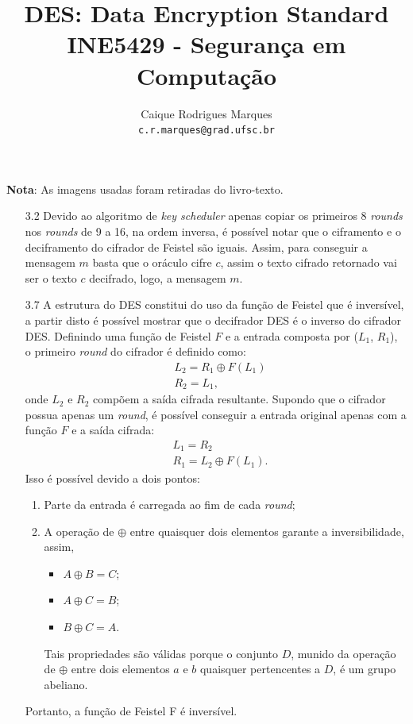 \documentclass{article}
\title{\textbf{DES: Data Encryption Standard \\
        \large INE5429 - Segurança em Computação}}
\author{
    Caique Rodrigues Marques \\
    {\texttt{c.r.marques@grad.ufsc.br}}
}
\date{}
\begin{document}
\maketitle


\textbf{Nota}: As imagens usadas foram retiradas do
livro-texto\cite{stallings2014}.

\begin{enumerate}
    \item[3.2] Devido ao algoritmo de \textit{key scheduler} apenas copiar os
        primeiros 8 \textit{rounds} nos \textit{rounds} de 9 a 16, na ordem
        inversa, é possível notar que o ciframento e o deciframento do cifrador
        de Feistel são iguais. Assim, para conseguir a mensagem $m$ basta que o
        oráculo cifre $c$, assim o texto cifrado retornado vai ser o texto $c$
        decifrado, logo, a mensagem $m$.

    \item[3.7] A estrutura do DES constitui do uso da função de Feistel que é
        inversível, a partir disto é possível mostrar que o decifrador DES é o
        inverso do cifrador DES. Definindo uma função de Feistel $F$ e a
        entrada composta por ($L_{1}$, $R_{1}$), o primeiro \textit{round} do
        cifrador é definido como:
    \begin{align*}
        & L_{2} = R_{1} \oplus F(L_{1}) \\
        & R_{2} = L_{1},
    \end{align*}
    onde $L_{2}$ e $R_{2}$ compõem a saída cifrada resultante. Supondo que o
        cifrador possua apenas um \textit{round}, é possível conseguir a
        entrada original apenas com a função $F$ e a saída cifrada:
    \begin{align*}
        & L_{1} = R_{2} \\
        & R_{1} = L_{2} \oplus F(L_{1}).
    \end{align*}
    Isso é possível devido a dois pontos:
    \begin{enumerate}
        \item Parte da entrada é carregada ao fim de cada \textit{round};
        \item A operação de $\oplus$ entre quaisquer dois elementos garante a
            inversibilidade, assim, 
        \begin{itemize}
            \item $A \oplus B = C$;
            \item $A \oplus C = B$;
            \item $B \oplus C = A$.
        \end{itemize}
        Tais propriedades são válidas porque o conjunto $D$, munido da operação
            de $\oplus$ entre dois elementos $a$ e $b$ quaisquer pertencentes a
            $D$, é um grupo abeliano.\footnotemark[1]
    \end{enumerate}
    Portanto, a função de Feistel F é inversível.
    

\end{enumerate}
\end{document}
